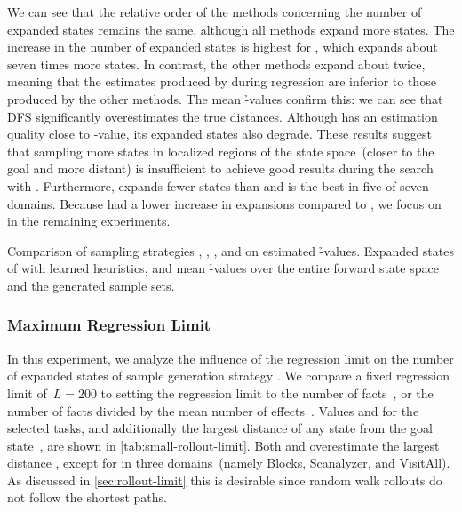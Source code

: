 We can see that the relative order of the methods concerning the number of expanded states remains the same, although all methods expand more states. The increase in the number of expanded states is highest for \hnnl{\dfs}, which expands about seven times more states. In contrast, the other methods expand about twice, meaning that the estimates produced by \dfs during regression are inferior to those produced by the other methods. The mean \h-values confirm this: we can see that DFS significantly overestimates the true distances. Although \bfs has an estimation quality close to \hstar-value, its expanded states also degrade. These results suggest that sampling more states in localized regions of the state space~(\bfs closer to the goal and \dfs more distant) is insufficient to achieve good results during the search with \gbfs. Furthermore, \hnnl{\bfsrw} expands fewer states than \hnnl{\rw} and is the best in five of seven domains. Because \hnnl{\bfsrw} had a lower increase in expansions compared to \hnnl{\rw}, we focus on \bfsrw in the remaining experiments.

\begin{table}[ht]
    \caption[Comparison of sampling strategies on estimated \h-values.]{Comparison of sampling strategies \bfs, \dfs, \rw, and \bfsrw on estimated \h-values. Expanded states of \gbfs with learned heuristics, and mean \h-values over the entire forward state space and the generated sample sets.}
    \label{tab:small-sampling-h}
    \addmargin
    \centering
    
\end{table}

\subsubsection{Maximum Regression Limit}
\label{sec:small-exps-rollout-limit}

In this experiment, we analyze the influence of the regression limit on the number of expanded states of sample generation strategy \bfsrw. We compare a fixed regression limit of~$L=200$ to setting the regression limit to the number of facts~\facts, or the number of facts divided by the mean number of effects~\meanfx. Values \facts and \meanfx for the selected tasks, and additionally the largest distance of any state from the goal state~\ssdiameter, are shown in \cref{tab:small-rollout-limit}. Both \facts and \meanfx overestimate the largest distance \ssdiameter, except for \meanfx in three domains~(namely Blocks, Scanalyzer, and VisitAll). As discussed in \cref{sec:rollout-limit} this is desirable since random walk rollouts do not follow the shortest paths.

